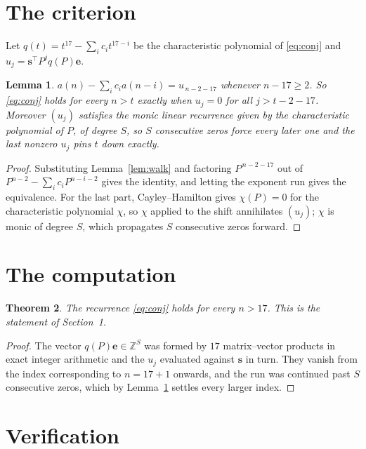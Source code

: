 \documentclass[11pt,a4paper]{article}
\theoremstyle{plain}
\newtheorem{theorem}{Theorem}
\newtheorem{lemma}[theorem]{Lemma}
\theoremstyle{definition}
\begin{document}
\section{The criterion}

Let $q(t)=t^{17}-\sum_i c_i t^{17-i}$ be the characteristic polynomial of
\eqref{eq:conj} and $u_j=\mathbf{s}^{\!\top}P^{j}q(P)\mathbf{e}$.

\begin{lemma}\label{lem:crit}
$a(n)-\sum_i c_i a(n-i)=u_{\,n-2-17}$ whenever $n-17\ge2$. So \eqref{eq:conj}
holds for every $n>t$ exactly when $u_j=0$ for all $j>t-2-17$. Moreover $(u_j)$
satisfies the monic linear recurrence given by the characteristic polynomial of $P$, of
degree $S$, so $S$ consecutive zeros force every later one and the last nonzero $u_j$ pins
$t$ down exactly.
\end{lemma}

\begin{proof}
Substituting Lemma~\ref{lem:walk} and factoring $P^{\,n-2-17}$ out of
$P^{n-2}-\sum_i c_i P^{n-i-2}$ gives the identity, and letting the exponent run gives the
equivalence. For the last part, Cayley--Hamilton gives $\chi(P)=0$ for the characteristic
polynomial $\chi$, so $\chi$ applied to the shift annihilates $(u_j)$; $\chi$ is monic of
degree $S$, which propagates $S$ consecutive zeros forward.
\end{proof}

\section{The computation}

\begin{theorem}
The recurrence \eqref{eq:conj} holds for every $n>17$. This is the statement of
Section~1.
\end{theorem}

\begin{proof}
The vector $q(P)\mathbf{e}\in\mathbb{Z}^{S}$ was formed by $17$ matrix--vector
products in exact integer arithmetic and the $u_j$ evaluated against $\mathbf{s}$ in turn.
They vanish from the index corresponding to $n=17+1$ onwards, and the run was continued
past $S$ consecutive zeros, which by Lemma~\ref{lem:crit} settles every larger index.
\end{proof}

\section{Verification}
\end{document}
